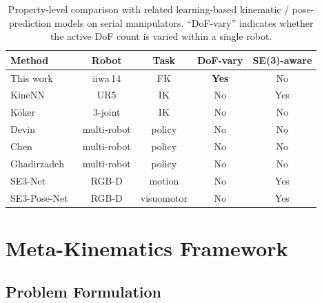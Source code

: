 \documentclass[conference]{IEEEtran}
\begin{document}
\begin{table}[!t]
\renewcommand{\arraystretch}{1.15}
\caption{Property-level comparison with related learning-based kinematic / pose-prediction models on serial manipulators. ``DoF-vary'' indicates whether the active DoF count is varied within a single robot.}
\label{tab:propcomp}
\centering
\footnotesize
\begin{tabular}{lcccc}
\toprule
Method & Robot & Task & DoF-vary & SE(3)-aware \\
\midrule
This work & iiwa\,14 & FK & \textbf{Yes} & No \\
KineNN~\cite{diprasetya2025} & UR5 & IK & No & Yes \\
K{\"o}ker~\cite{koker2004} & 3-joint & IK & No & No \\
Devin~\cite{devin2017} & multi-robot & policy & No & No \\
Chen~\cite{chen2018} & multi-robot & policy & No & No \\
Ghadirzadeh~\cite{ghadirzadeh2021} & multi-robot & policy & No & No \\
SE3-Net~\cite{byravan2017} & RGB-D & motion & No & Yes \\
SE3-Pose-Net~\cite{byravan2018} & RGB-D & visuomotor & No & Yes \\
\bottomrule
\end{tabular}
\end{table}

\section{Meta-Kinematics Framework}\label{sec:method}

\subsection{Problem Formulation}
\end{document}
